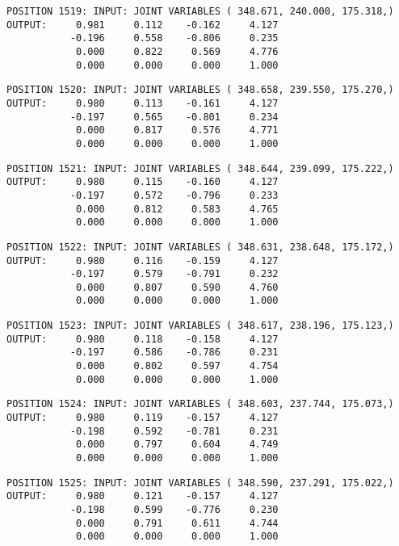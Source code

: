 \begin{verbatim}
POSITION 1519: INPUT: JOINT VARIABLES ( 348.671, 240.000, 175.318,)
OUTPUT:     0.981     0.112    -0.162     4.127
           -0.196     0.558    -0.806     0.235
            0.000     0.822     0.569     4.776
            0.000     0.000     0.000     1.000
\end{verbatim} \pagebreak[1]\begin{verbatim}
POSITION 1520: INPUT: JOINT VARIABLES ( 348.658, 239.550, 175.270,)
OUTPUT:     0.980     0.113    -0.161     4.127
           -0.197     0.565    -0.801     0.234
            0.000     0.817     0.576     4.771
            0.000     0.000     0.000     1.000
\end{verbatim} \pagebreak[1]\begin{verbatim}
POSITION 1521: INPUT: JOINT VARIABLES ( 348.644, 239.099, 175.222,)
OUTPUT:     0.980     0.115    -0.160     4.127
           -0.197     0.572    -0.796     0.233
            0.000     0.812     0.583     4.765
            0.000     0.000     0.000     1.000
\end{verbatim} \pagebreak[1]\begin{verbatim}
POSITION 1522: INPUT: JOINT VARIABLES ( 348.631, 238.648, 175.172,)
OUTPUT:     0.980     0.116    -0.159     4.127
           -0.197     0.579    -0.791     0.232
            0.000     0.807     0.590     4.760
            0.000     0.000     0.000     1.000
\end{verbatim} \pagebreak[1]\begin{verbatim}
POSITION 1523: INPUT: JOINT VARIABLES ( 348.617, 238.196, 175.123,)
OUTPUT:     0.980     0.118    -0.158     4.127
           -0.197     0.586    -0.786     0.231
            0.000     0.802     0.597     4.754
            0.000     0.000     0.000     1.000
\end{verbatim} \pagebreak[1]\begin{verbatim}
POSITION 1524: INPUT: JOINT VARIABLES ( 348.603, 237.744, 175.073,)
OUTPUT:     0.980     0.119    -0.157     4.127
           -0.198     0.592    -0.781     0.231
            0.000     0.797     0.604     4.749
            0.000     0.000     0.000     1.000
\end{verbatim} \pagebreak[1]\begin{verbatim}
POSITION 1525: INPUT: JOINT VARIABLES ( 348.590, 237.291, 175.022,)
OUTPUT:     0.980     0.121    -0.157     4.127
           -0.198     0.599    -0.776     0.230
            0.000     0.791     0.611     4.744
            0.000     0.000     0.000     1.000
\end{verbatim} \pagebreak[1]\begin{verbatim}

\end{verbatim}
